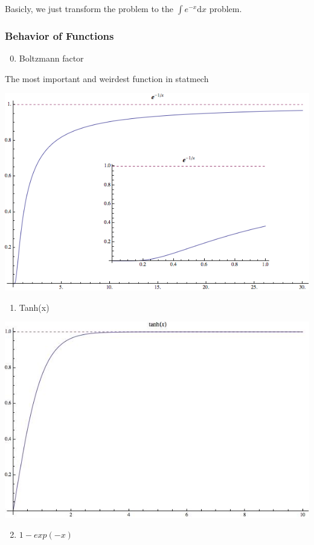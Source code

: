 \documentclass[letterpaper,10pt,english]{sphinxmanual}
\begin{document}
Basicly, we just transform the problem to the $\int e^{-x} \mathrm dx$ problem.


\subsubsection{Behavior of Functions}
\label{vocabulary/vocabulary:behavior-of-functions}\begin{enumerate}
\setcounter{enumi}{-1}
\item {} 
Boltzmann factor

\end{enumerate}

The most important and weirdest function in statmech

\includegraphics[width=0.800\linewidth]{boltzfactor1.png}
\begin{enumerate}
\item {} 
Tanh(x)

\end{enumerate}

\includegraphics[width=0.800\linewidth]{tanh1.jpg}
\begin{enumerate}
\setcounter{enumi}{1}
\item {} 
$1-exp(-x)$

\end{enumerate}
\end{document}
